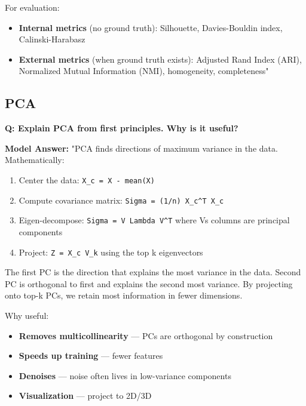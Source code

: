 \documentclass[11pt]{article}
\providecommand{\tightlist}{\setlength{\itemsep}{1pt}\setlength{\parskip}{0pt}}
\begin{document}
For evaluation:

\begin{itemize}
\tightlist
\item
  \textbf{Internal metrics} (no ground truth): Silhouette, Davies-Bouldin index, Calinski-Harabasz
\item
  \textbf{External metrics} (when ground truth exists): Adjusted Rand Index (ARI), Normalized Mutual Information (NMI), homogeneity, completeness"
\end{itemize}

\subsection{PCA}\label{pca-1}

\textbf{Q: Explain PCA from first principles. Why is it useful?}

\textbf{Model Answer:}
"PCA finds directions of maximum variance in the data. Mathematically:

\begin{enumerate}
\def\labelenumi{\arabic{enumi}.}
\tightlist
\item
  Center the data: \texttt{X\_c\ =\ X\ -\ mean(X)}
\item
  Compute covariance matrix: \texttt{Sigma\ =\ (1/n)\ X\_c\^{}T\ X\_c}
\item
  Eigen-decompose: \texttt{Sigma\ =\ V\ Lambda\ V\^{}T} where V\textquotesingle s columns are principal components
\item
  Project: \texttt{Z\ =\ X\_c\ V\_k} using the top k eigenvectors
\end{enumerate}

The first PC is the direction that explains the most variance in the data. Second PC is orthogonal to first and explains the second most variance. By projecting onto top-k PCs, we retain most information in fewer dimensions.

Why useful:

\begin{itemize}
\tightlist
\item
  \textbf{Removes multicollinearity} --- PCs are orthogonal by construction
\item
  \textbf{Speeds up training} --- fewer features
\item
  \textbf{Denoises} --- noise often lives in low-variance components
\item
  \textbf{Visualization} --- project to 2D/3D
\end{itemize}
\end{document}
